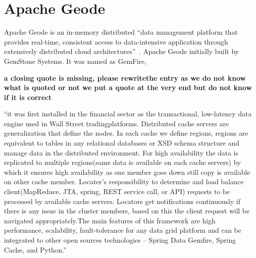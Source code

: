 \section{Apache Geode}

Apache Geode is an in-memory distributed ``data management platform
that provides real-time, consistent access to data-intensive
application through extensively distributed cloud
architectures''~\cite{hid-sp18-514-apachegeodewiki}. Apache Geode
initially built by GemStone Systems. It was named as GemFire, 

{\bf a closing quote is missing, please rewritethe entry as we do not
  know what is quoted or not we put a quote at the very end but do not
  know if it is correct}

``it was
first installed in the financial sector as the transactional,
low-latency data engine used in Wall Street tradingplatforms.
Distributed cache servers are generalization that define the nodes. In
each cache we define regions, regions are equivalent to tables in any
relational databases or XSD schema structure and manage data in the
distributed environment. For high availability the data is replicated
to multiple regions(same data is available on each cache servers) by
which it ensures high availability as one member goes down still copy
is available on other cache member. Locater’s responsibility to
determine and load balance client(MapReduce, JTA, spring, REST service
call, or API) requests to be processed by available cache servers.
Locators get notifications continuously if there is any issue in the
cluster members, based on this the client request will be navigated
appropriately\cite{hid-sp18-514-apachegeodewiki}.The main features of
this framework are high performance, scalability, fault-tolerance for
any data grid platform and can be integrated to other open sources
technologies – Spring Data
Gemfire\cite{hid-sp18-514-geodespringgemfire}, Spring
Cache\cite{hid-sp18-514-geodespringcache}, and
Python\cite{hid-sp18-514-geodepython}.''
